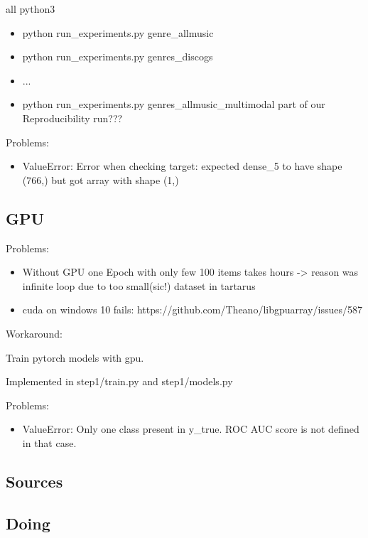 \documentclass[sigconf,nonacm]{acmart}
\begin{document}
all python3

\begin{itemize}
  \item python run\_experiments.py genre\_allmusic
  \item python run\_experiments.py genres\_discogs
  \item ... 
  \item python run\_experiments.py genres\_allmusic\_multimodal part of our Reproducibility run???
\end{itemize}

Problems:
\begin{itemize}
  \item ValueError: Error when checking target: expected dense\_5 to have shape (766,) but got array with shape (1,)
\end{itemize}

\subsection{GPU}

Problems:

\begin{itemize}
  \item Without GPU one Epoch with only few 100 items takes hours -> reason was infinite loop due to too small(sic!) dataset in tartarus
  \item cuda on windows 10 fails: https://github.com/Theano/libgpuarray/issues/587
\end{itemize}

Workaround:

Train pytorch models with gpu.

Implemented in step1/train.py and step1/models.py 

Problems:
\begin{itemize}
  \item ValueError: Only one class present in y\_true. ROC AUC score is not defined in that case.
\end{itemize}

\subsection{Sources}

\subsection{Doing}






\end{document}
